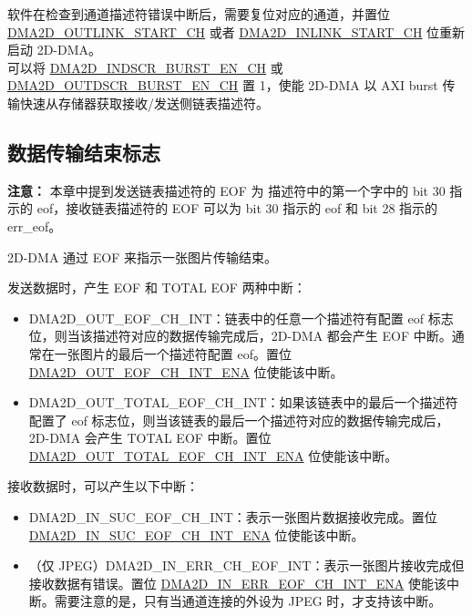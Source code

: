\documentclass[main\_\_CN.tex]{subfiles}
\begin{document}
软件在检查到通道描述符错误中断后，需要复位对应的通道，并置位 \hyperref[fielddesc:DMA2DOUTLINKSTARTCHN]{DMA2D\_OUTLINK\_START\_CH} 或者  \hyperref[fielddesc:DMA2DINLINKSTARTCHN]{DMA2D\_INLINK\_START\_CH} 位重新启动 2D-DMA。\\

可以将 \hyperref[fielddesc:DMA2DINDSCRBURSTENCHN]{DMA2D\_INDSCR\_BURST\_EN\_CH} 或 \hyperref[fielddesc:DMA2DOUTDSCRBURSTENCHN]{DMA2D\_OUTDSCR\_BURST\_EN\_CH} 置 1，使能 2D-DMA 以 AXI burst 传输快速从存储器获取接收/发送侧链表描述符。


\subsection{数据传输结束标志}

{\bfseries 注意：} 本章中提到发送链表描述符的 EOF 为 描述符中的第一个字中的 bit 30 指示的 eof，接收链表描述符的 EOF 可以为 bit 30 指示的 eof 和 bit 28 指示的 err\_eof。

 2D-DMA 通过 EOF 来指示一张图片传输结束。

发送数据时，产生 EOF 和 TOTAL EOF 两种中断：
\begin{itemize}
    \item DMA2D\_OUT\_EOF\_CH\_INT：链表中的任意一个描述符有配置 eof 标志位，则当该描述符对应的数据传输完成后，2D-DMA 都会产生 EOF 中断。通常在一张图片的最后一个描述符配置 eof。置位 \hyperref[fielddesc:DMA2DOUTEOFCHNINTENA]{DMA2D\_OUT\_EOF\_CH\_INT\_ENA} 位使能该中断。
    \item DMA2D\_OUT\_TOTAL\_EOF\_CH\_INT：如果该链表中的最后一个描述符配置了 eof 标志位，则当该链表的最后一个描述符对应的数据传输完成后，2D-DMA 会产生 TOTAL EOF 中断。置位 \hyperref[fielddesc:DMA2DOUTTOTALEOFCHNINTENA]{DMA2D\_OUT\_TOTAL\_EOF\_CH\_INT\_ENA} 位使能该中断。
\end{itemize}


接收数据时，可以产生以下中断：
\begin{itemize}
    \item DMA2D\_IN\_SUC\_EOF\_CH\_INT：表示一张图片数据接收完成。置位 \hyperref[fielddesc:DMA2DINSUCEOFCHNINTENA]{DMA2D\_IN\_SUC\_EOF\_CH\_INT\_ENA} 位使能该中断。
    \item（仅 JPEG）DMA2D\_IN\_ERR\_CH\_EOF\_INT：表示一张图片接收完成但接收数据有错误。置位 \hyperref[fielddesc:DMA2DINERREOFCHNINTENA]{DMA2D\_IN\_ERR\_EOF\_CH\_INT\_ENA} 使能该中断。需要注意的是，只有当通道连接的外设为 JPEG 时，才支持该中断。
\end{itemize}
\end{document}
